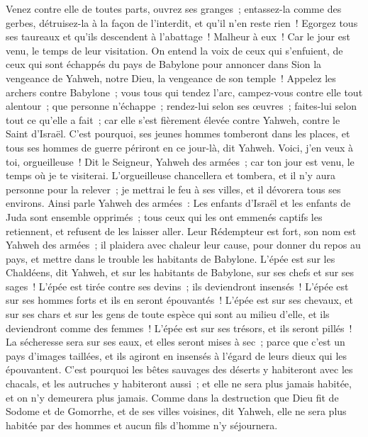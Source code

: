 \begin{multicols}{2}
Venez contre elle de toutes parts, ouvrez ses granges~; entassez-la comme des gerbes, détruisez-la à la façon de l'interdit, et qu'il n'en reste rien~!
Egorgez tous ses taureaux et qu'ils descendent à l'abattage~! Malheur à eux~! Car le jour est venu, le temps de leur visitation.
On entend la voix de ceux qui s'enfuient, de ceux qui sont échappés du pays de Babylone pour annoncer dans Sion la vengeance de Yahweh, notre Dieu, la vengeance de son temple~!
Appelez les archers contre Babylone~; vous tous qui tendez l'arc, campez-vous contre elle tout alentour~; que personne n'échappe~; rendez-lui selon ses œuvres~; faites-lui selon tout ce qu'elle a fait~; car elle s'est fièrement élevée contre Yahweh, contre le Saint d'Israël.
C'est pourquoi, ses jeunes hommes tomberont dans les places, et tous ses hommes de guerre périront en ce jour-là, dit Yahweh.
Voici, j'en veux à toi, orgueilleuse~! Dit le Seigneur, Yahweh des armées~; car ton jour est venu, le temps où je te visiterai.
L'orgueilleuse chancellera et tombera, et il n'y aura personne pour la relever~; je mettrai le feu à ses villes, et il dévorera tous ses environs.
Ainsi parle Yahweh des armées~: Les enfants d'Israël et les enfants de Juda sont ensemble opprimés~; tous ceux qui les ont emmenés captifs les retiennent, et refusent de les laisser aller.
Leur Rédempteur est fort, son nom est Yahweh des armées~; il plaidera avec chaleur leur cause, pour donner du repos au pays, et mettre dans le trouble les habitants de Babylone.
L'épée est sur les Chaldéens, dit Yahweh, et sur les habitants de Babylone, sur ses chefs et sur ses sages~!
L'épée est tirée contre ses devins~; ils deviendront insensés~! L'épée est sur ses hommes forts et ils en seront épouvantés~!
L'épée est sur ses chevaux, et sur ses chars et sur les gens de toute espèce qui sont au milieu d'elle, et ils deviendront comme des femmes~! L'épée est sur ses trésors, et ils seront pillés~!
La sécheresse sera sur ses eaux, et elles seront mises à sec~; parce que c'est un pays d'images taillées, et ils agiront en insensés à l'égard de leurs dieux qui les épouvantent.
C'est pourquoi les bêtes sauvages des déserts y habiteront avec les chacals, et les autruches y habiteront aussi~; et elle ne sera plus jamais habitée, et on n'y demeurera plus jamais.
Comme dans la destruction que Dieu fit de Sodome et de Gomorrhe, et de ses villes voisines, dit Yahweh, elle ne sera plus habitée par des hommes et aucun fils d'homme n'y séjournera.

\end{multicols}
